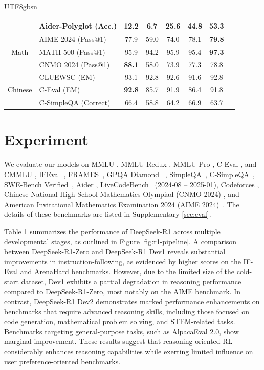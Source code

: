 \documentclass[11pt, a4paper, logo, copyright, nonumbering]{deepseek}
\begin{document}
\begin{CJK*}{UTF8}{gbsn}
\begin{table}[h]
\begin{tabular}{@{}c l | c c  c  c |c c@{}}
    & Aider-Polyglot {\tiny (Acc.)}   & 12.2 &6.7 & 25.6&  44.8 &   \textbf{53.3}\\
    \midrule
    \multirow{3}{*}{Math} & AIME 2024 {\tiny (Pass@1)} & 77.9 & 59.0 & 74.0 & 78.1 &   \textbf{79.8} \\
    & MATH-500 {\tiny (Pass@1)}   & 95.9 & 94.2 & 95.9 &  95.4 &  \textbf{97.3} \\
    & CNMO 2024 {\tiny (Pass@1)}  & \textbf{88.1} &58.0 & 73.9 & 77.3  &  {78.8} \\
    \midrule
    \multirow{3}{*}{Chinese} & CLUEWSC {\tiny (EM)}  & 93.1 & 92.8 & 92.6 &  91.6 &   {92.8}\\
    & C-Eval {\tiny (EM)}   & \textbf{92.8} & 85.7 & 91.9 &  86.4 &  {91.8}\\
     & C-SimpleQA {\tiny (Correct)} & 66.4 & 58.8 & 64.2 & 66.9 &  63.7 \\
    \bottomrule
    \end{tabular}
    
    \label{tab:stage_r1}
\end{table}



\section{Experiment}

 We evaluate our models on MMLU \citep{mmlu}, MMLU-Redux \citep{mmlu_redux}, MMLU-Pro \citep{mmlu_pro}, C-Eval \citep{ceval}, and CMMLU \citep{cmmlu}, IFEval~\citep{IFeval}, FRAMES~\citep{frames}, GPQA Diamond ~\citep{gpqa}, SimpleQA~\citep{simpleqa}, C-SimpleQA~\citep{csimpleqa}, SWE-Bench Verified~\citep{swe_verified}, Aider \citep{aider}, LiveCodeBench~\citep{livecodebench} (2024-08 -- 2025-01), Codeforces \citep{codeforces}, Chinese National High School Mathematics Olympiad (CNMO 2024) \citep{cnmo}, and American Invitational Mathematics Examination 2024 (AIME 2024)~\citep{AIME2024}. The details of these benchmarks are listed in Supplementary \ref{sec:eval}. 
% 

Table \ref{tab:stage_r1} summarizes the performance of DeepSeek-R1 across multiple developmental stages, as outlined in Figure \ref{fig:r1-pipeline}. A comparison between DeepSeek-R1-Zero and DeepSeek-R1 Dev1 reveals substantial improvements in instruction-following, as evidenced by higher scores on the IF-Eval and ArenaHard benchmarks. However, due to the limited size of the cold-start dataset, Dev1 exhibits a partial degradation in reasoning performance compared to DeepSeek-R1-Zero, most notably on the AIME benchmark. In contrast, DeepSeek-R1 Dev2 demonstrates marked performance enhancements on benchmarks that require advanced reasoning skills, including those focused on code generation, mathematical problem solving, and STEM-related tasks. Benchmarks targeting general-purpose tasks, such as AlpacaEval 2.0, show marginal improvement. These results suggest that reasoning-oriented RL considerably enhances reasoning capabilities while exerting limited influence on user preference-oriented benchmarks.


\end{CJK*}
\end{document}
